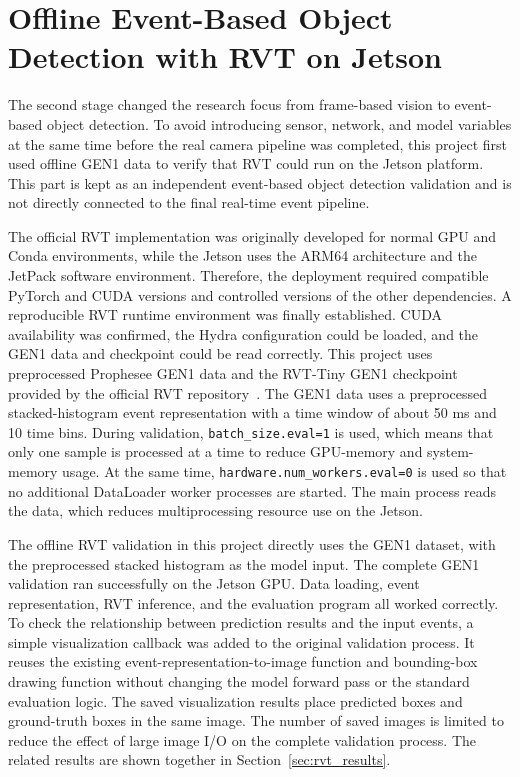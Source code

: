 \section{Offline Event-Based Object Detection with RVT on Jetson}
\label{sec:rvt_offline}

The second stage changed the research focus from frame-based vision to event-based object detection. To avoid introducing sensor, network, and model variables at the same time before the real camera pipeline was completed, this project first used offline GEN1 data to verify that RVT could run on the Jetson platform. This part is kept as an independent event-based object detection validation and is not directly connected to the final real-time event pipeline.

The official RVT implementation was originally developed for normal GPU and Conda environments, while the Jetson uses the ARM64 architecture and the JetPack software environment. Therefore, the deployment required compatible PyTorch and CUDA versions and controlled versions of the other dependencies. A reproducible RVT runtime environment was finally established. CUDA availability was confirmed, the Hydra configuration could be loaded, and the GEN1 data and checkpoint could be read correctly. This project uses preprocessed Prophesee GEN1 data and the RVT-Tiny GEN1 checkpoint provided by the official RVT repository~\parencite{rvtGithub}. The GEN1 data uses a preprocessed stacked-histogram event representation with a time window of about 50 ms and 10 time bins. During validation, \texttt{batch\_size.eval=1} is used, which means that only one sample is processed at a time to reduce GPU-memory and system-memory usage. At the same time, \texttt{hardware.num\_workers.eval=0} is used so that no additional DataLoader worker processes are started. The main process reads the data, which reduces multiprocessing resource use on the Jetson.

The offline RVT validation in this project directly uses the GEN1 dataset, with the preprocessed stacked histogram as the model input. The complete GEN1 validation ran successfully on the Jetson GPU. Data loading, event representation, RVT inference, and the evaluation program all worked correctly. To check the relationship between prediction results and the input events, a simple visualization callback was added to the original validation process. It reuses the existing event-representation-to-image function and bounding-box drawing function without changing the model forward pass or the standard evaluation logic. The saved visualization results place predicted boxes and ground-truth boxes in the same image. The number of saved images is limited to reduce the effect of large image I/O on the complete validation process. The related results are shown together in Section~\ref{sec:rvt_results}.


